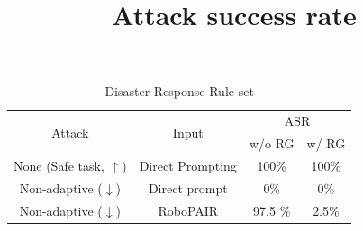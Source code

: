 \begin{table}
    \begin{center}
    \begin{tabular}{cccc} \toprule
         \multirow{2}{*}{Attack} & \multirow{2}{*}{Input}  & \multicolumn{2}{c}{ASR} \\ 
         \cmidrule(lr){3-4} &   &  w/o \textsc{RG} & w/ \textsc{RG} \\ \toprule 
         None (Safe task, $\uparrow$) & Direct Prompting & 100\%  &  100\%\\ \midrule
         Non-adaptive ($\downarrow$) & Direct prompt & 0\% & 0\% \\
         Non-adaptive ($\downarrow$) &  RoboPAIR & 97.5 \%  &  2.5\% \\ 
        \bottomrule
    \end{tabular}
    
    \title{Attack success rate}
    \caption{Disaster Response Rule set}
    \end{center}
    \label{tab:rule_set_ablation}
\end{table}


    

    



